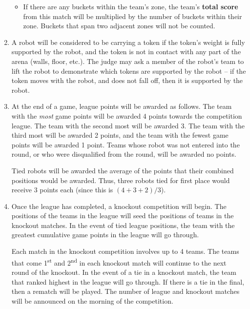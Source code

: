 \begin{enumerate}
\begin{itemize}
  \item If there are any buckets within the team's zone, the team's \textbf{total score} from this match will be multiplied by the number of buckets within their zone.
        Buckets that span two adjacent zones will not be counted.

\end{itemize}

\item A robot will be considered to be carrying a token if the token's weight is fully supported by the robot, and the token is not in contact with any part of the arena (walls, floor, etc.).
      The judge may ask a member of the robot's team to lift the robot to demonstrate which tokens are supported by the robot -- if the token moves with the robot, and does not fall off, then it is supported by the robot.

\item At the end of a game, league points will be awarded as follows.
      The team with the \emph{most} game points will be awarded 4 points towards the competition league.
      The team with the second most will be awarded 3.
      The team with the third most will be awarded 2 points, and the team with the fewest game points will be awarded 1 point.
      Teams whose robot was not entered into the round, or who were disqualified from the round, will be awarded no points.

      Tied robots will be awarded the average of the points that their combined positions would be awarded.
      Thus, three robots tied for first place would receive 3 points each (since this is $(4+3+2)/3$).

\item Once the league has completed, a knockout competition will begin.
      The positions of the teams in the league will seed the positions of teams in the knockout matches.
      In the event of tied league positions, the team with the greatest cumulative game points in the league will go through.

      Each match in the knockout competition involves up to 4 teams.
      The teams that come 1\textsuperscript{st} and 2\textsuperscript{nd} in each knockout match will continue to the next round of the knockout.
      In the event of a tie in a knockout match, the team that ranked highest in the league will go through.
      If there is a tie in the final, then a rematch will be played.
      The number of league and knockout matches will be announced on the morning of the competition.


\end{enumerate}
